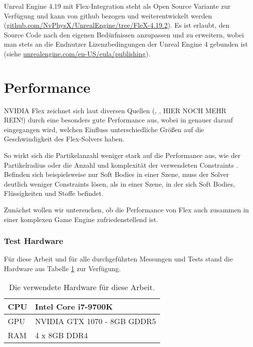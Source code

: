 Unreal Engine 4.19 mit Flex-Integration steht als Open Source Variante zur Verfügung und kann von github bezogen und weiterentwickelt werden (\url{github.com/NvPhysX/UnrealEngine/tree/FleX-4.19.2}). Es ist erlaubt, den Source Code nach den eigenen Bedürfnissen anzupassen und zu erweitern, wobei man stets an die Endnutzer Lizenzbedingungen der Unreal Engine 4 gebunden ist (siehe \url{unrealengine.com/en-US/eula/publishing}).



\section{Performance}


NVIDIA Flex zeichnet sich laut diversen Quellen (\cite{FlexD3D}, \cite{UPP}, HIER NOCH MEHR REIN!) durch eine besonders gute Performance aus, wobei in \cite{FlexD3D} genauer darauf eingegangen wird, welchen Einfluss unterschiedliche Größen auf die Geschwindigkeit des Flex-Solvers haben. 

So wirkt sich die Partikelanzahl weniger stark auf die Performance aus, wie der Partikelradius oder die Anzahl und komplexität der verwendeten Constraints \cite{FlexD3D}. Befinden sich beispielsweise nur Soft Bodies in einer Szene, muss der Solver deutlich weniger Constraints lösen, als in einer Szene, in der sich Soft Bodies, Flüssigkeiten und Stoffe befindet.


Zunächst wollen wir untersuchen, ob die Performance von Flex auch zusammen in einer komplexen Game Engine zufriedenstellend ist.

\subsubsection{Test Hardware}

Für diese Arbeit und für alle durchgeführten Messungen und Tests stand die Hardware aus Tabelle \ref{table_hardware} zur Verfügung.

\clearpage

\begin{table}[]
\caption{Die verwendete Hardware für diese Arbeit.}
\label{table_hardware}
\begin{tabular}{l|l}
 \hline
CPU & Intel Core i7-9700K  \\ \hline
GPU & NVIDIA GTX 1070 - 8GB GDDR5      \\ \hline
RAM & 4 x 8GB DDR4            \\ \hline
\end{tabular}
\end{table}

